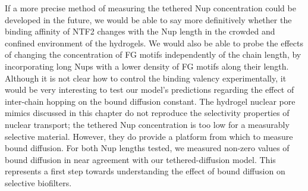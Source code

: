

If a more precise method of measuring the tethered Nup concentration could be developed in the future, we would be able to say more definitively whether the binding affinity of NTF2 changes with the Nup length in the crowded and confined environment of the hydrogels.  We would also be able to probe the effects of changing the concentration of FG motifs independently of the chain length, by incorporating long Nups with a lower density of FG motifs along their length.  Although it is not clear how to control the binding valency experimentally, it would be very interesting to test our model's predictions regarding the effect of inter-chain hopping on the bound diffusion constant.  %
The hydrogel nuclear pore mimics discussed in this chapter do not reproduce the selectivity properties of nuclear transport; the tethered Nup concentration is too low for a measurably selective material.  However, they do provide a platform from which to measure bound diffusion.  For both Nup lengths tested, we measured non-zero values of bound diffusion in near agreement with our tethered-diffusion model.  This represents a first step towards understanding the effect of bound diffusion on selective biofilters.


